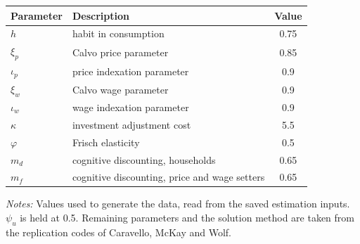 \begin{tabular}{@{}llc@{}}
\toprule
Parameter & Description & Value \\
\midrule
$h$ & habit in consumption & 0.75 \\
$\xi_p$ & Calvo price parameter & 0.85 \\
$\iota_p$ & price indexation parameter & 0.9 \\
$\xi_w$ & Calvo wage parameter & 0.9 \\
$\iota_w$ & wage indexation parameter & 0.9 \\
$\kappa$ & investment adjustment cost & 5.5 \\
$\varphi$ & Frisch elasticity & 0.5 \\
$m_d$ & cognitive discounting, households & 0.65 \\
$m_f$ & cognitive discounting, price and wage setters & 0.65 \\
\bottomrule
\end{tabular}

\smallskip
\begin{minipage}{0.72\linewidth}\footnotesize
\textit{Notes:} Values used to generate the data, read from the saved estimation inputs. $\psi_u$ is held at 0.5. Remaining parameters and the solution method are taken from the replication codes of Caravello, McKay and Wolf.
\end{minipage}
